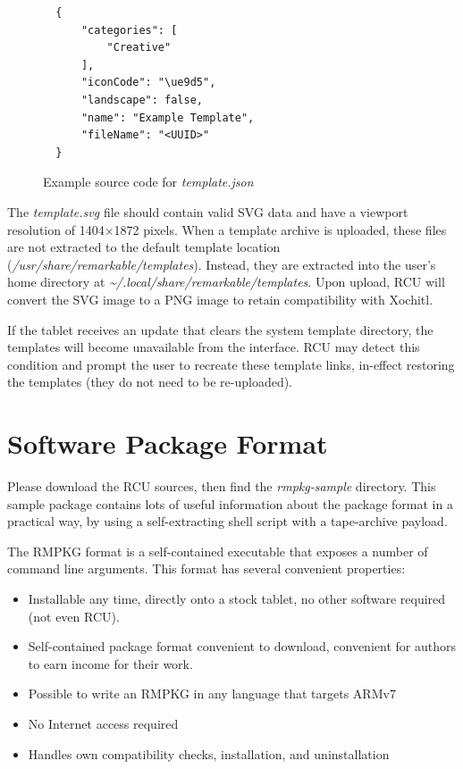 \documentclass{memoir}
\begin{document}
{\begin{figure}[h]
\begin{verbatim}
  {
      "categories": [
          "Creative"
      ],
      "iconCode": "\ue9d5",
      "landscape": false,
      "name": "Example Template",
      "fileName": "<UUID>"
  }
\end{verbatim}
\caption{Example source code for \textit{template.json}}
\label{fig:exampletemplatejson}
\end{figure}

The \textit{template.svg} file should contain valid SVG data and have a viewport resolution of 1404$\times$1872 pixels. When a template archive is uploaded, these files are not extracted to the default template location (\textit{/usr/share/remarkable/templates}). Instead, they are extracted into the user's home directory at \textit{\textasciitilde/.local/share/remarkable/templates}. Upon upload, RCU will convert the SVG image to a PNG image to retain compatibility with Xochitl.

If the tablet receives an update that clears the system template directory, the templates will become unavailable from the interface. RCU may detect this condition and prompt the user to recreate these template links, in-effect restoring the templates (they do not need to be re-uploaded).

\chapter{Software Package Format}
\label{sec:softwarepackageformat}
Please download the RCU sources, then find the \textit{rmpkg-sample} directory. This sample package contains lots of useful information about the package format in a practical way, by using a self-extracting shell script with a tape-archive payload.

The RMPKG format is a self-contained executable that exposes a number of command line arguments. This format has several convenient properties:

\begin{itemize}
\item{Installable any time, directly onto a stock tablet, no other software required (not even RCU).}
\item{Self-contained package format convenient to download, convenient for authors to earn income for their work.}
\item{Possible to write an RMPKG in any language that targets ARMv7}
  \item{No Internet access required}
\item{Handles own compatibility checks, installation, and uninstallation}
  \end{itemize}


}
\end{document}
